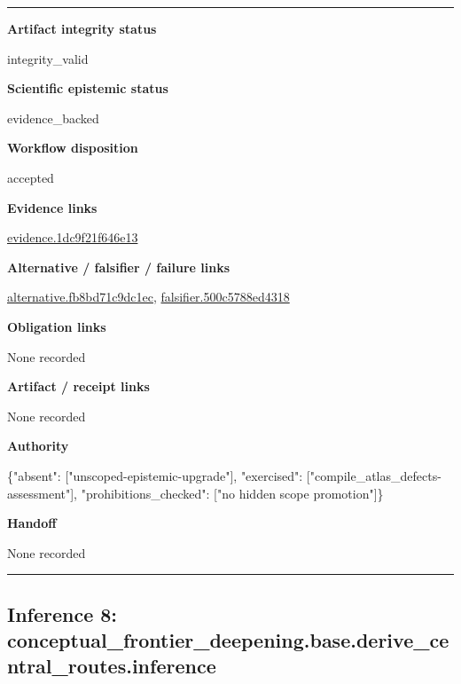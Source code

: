 \documentclass[10pt,a4paper]{article}
\newcommand{\TraceField}[2]{\par\noindent\textbf{#1}\par\noindent #2\par\smallskip}
\newenvironment{TraceDossier}{\par\medskip\noindent\hrule\medskip}{\medskip\hrule\par\medskip}
\begin{document}
\begin{TraceDossier}
\TraceField{Artifact integrity status}{integrity\_\allowbreak{}valid}

\TraceField{Scientific epistemic status}{evidence\_\allowbreak{}backed}

\TraceField{Workflow disposition}{accepted}

\TraceField{Evidence links}{\hyperlink{trace-evidence-2fddfd5c6329daf538}{evidence.\allowbreak{}1dc9f21f64\allowbreak{}6e13}}

\TraceField{Alternative / falsifier / failure links}{\hyperlink{trace-alternative-21f4f8713e113f84f9}{alternativ\allowbreak{}e.\allowbreak{}fb8bd71c9d\allowbreak{}c1ec}, \hyperlink{trace-alternative-f22431bf40385c99b5}{falsifier.\allowbreak{}500c5788ed\allowbreak{}4318}}

\TraceField{Obligation links}{None recorded}

\TraceField{Artifact / receipt links}{None recorded}

\TraceField{Authority}{\{"absent":\allowbreak{} ["unscoped\allowbreak{}-\allowbreak{}epistemic-\allowbreak{}upgrade"],\allowbreak{} "exercised\allowbreak{}":\allowbreak{} ["compile\_\allowbreak{}atlas\_\allowbreak{}defects-\allowbreak{}assessment\allowbreak{}"], "prohibiti\allowbreak{}ons\_\allowbreak{}checked":\allowbreak{} ["no hidden scope promotion"\allowbreak{}]\}}

\TraceField{Handoff}{None recorded}

\end{TraceDossier}
\pagebreak[2]\subsection{Inference 8: conceptual\allowbreak{}\_\allowbreak{}frontier\_\allowbreak{}deepening.\allowbreak{}base.\allowbreak{}derive\_\allowbreak{}central\_\allowbreak{}routes.\allowbreak{}inference}\label{trace-inference-e5396a3a4f226d3b08}
\end{document}
